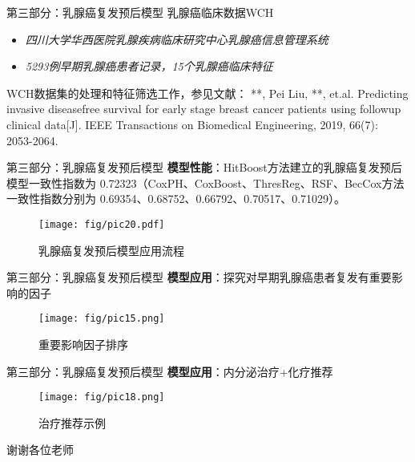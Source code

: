 \documentclass[10pt]{beamer}
\begin{document}
\begin{frame}{第三部分：乳腺癌复发预后模型}
  乳腺癌临床数据WCH
  \begin{itemize}
    \item \textit{四川大学华西医院乳腺疾病临床研究中心乳腺癌信息管理系统}
    \item \textit{5293例早期乳腺癌患者记录，15个乳腺癌临床特征}
  \end{itemize}

  WCH数据集的处理和特征筛选工作，参见文献： **, Pei Liu, **, et.al. Predicting invasive disease­free survival for early stage breast cancer patients using follow­up clinical data[J]. IEEE Transactions on Biomedical Engineering, 2019, 66(7): 2053­-2064.
\end{frame}

\begin{frame}{第三部分：乳腺癌复发预后模型}
  \textbf{模型性能}：HitBoost方法建立的乳腺癌复发预后模型一致性指数为 0.72323（CoxPH、CoxBoost、ThresReg、RSF、BecCox方法一致性指数分别为 0.69354、0.68752、0.66792、0.70517、0.71029）。

  \begin{figure}[H]
    \centering
    \texttt{[image: fig/pic20.pdf]}
    \caption{乳腺癌复发预后模型应用流程}
  \end{figure}
\end{frame}

\begin{frame}{第三部分：乳腺癌复发预后模型}
  \textbf{模型应用}：探究对早期乳腺癌患者复发有重要影响的因子
  \begin{figure}[H]
    \centering
    \texttt{[image: fig/pic15.png]}
    \caption{重要影响因子排序}
  \end{figure}
\end{frame}

\begin{frame}{第三部分：乳腺癌复发预后模型}
  \textbf{模型应用}：内分泌治疗+化疗推荐
  \begin{figure}[H]
    \centering
    \texttt{[image: fig/pic18.png]}
    \caption{治疗推荐示例}
  \end{figure}
\end{frame}

\begin{frame}[standout]
  谢谢各位老师
\end{frame}
\end{document}
